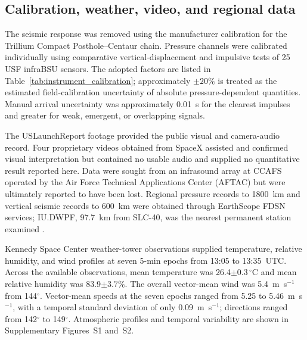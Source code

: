 \documentclass[]{seismica}
\begin{document}
\subsection{Calibration, weather, video, and regional data}

The seismic response was removed using the manufacturer calibration for the
Trillium Compact Posthole--Centaur chain. Pressure channels were calibrated
individually using comparative vertical-displacement and impulsive tests of 25
USF infraBSU sensors. The adopted factors are listed in
Table~\ref{tab:instrument_calibration}; approximately $\pm20\%$ is treated as
the estimated field-calibration uncertainty of absolute pressure-dependent
quantities. Manual arrival uncertainty was approximately 0.01~s for the
clearest impulses and greater for weak, emergent, or overlapping signals. 

The USLaunchReport footage provided the public visual and camera-audio record.
Four proprietary videos obtained from SpaceX assisted and confirmed visual
interpretation but contained no usable audio and supplied no quantitative
result reported here. Data were sought from an infrasound array at CCAFS
operated by the Air Force Technical Applications Center (AFTAC) 
but were ultimately reported to have been lost. Regional pressure records to 1800~km
and vertical seismic records to 600~km were obtained through EarthScope FDSN
services; IU.DWPF, 97.7~km from SLC-40, was the nearest permanent station
examined \citep{asl_gsn_iu_1988}. 

Kennedy Space Center weather-tower observations supplied temperature,
relative humidity, and wind profiles at seven 5-min epochs from 13:05 to
13:35~UTC. Across the available observations, mean temperature was
26.4$\pm0.3\,^{\circ}$C and mean relative humidity was
83.9$\pm3.7\%$. The overall vector-mean wind was 5.4~m~s$^{-1}$ from
144$^\circ$. Vector-mean speeds at the seven epochs ranged from 5.25 to
5.46~m~s$^{-1}$, with a temporal standard deviation of only
0.09~m~s$^{-1}$; directions ranged from 142$^\circ$ to 149$^\circ$.
Atmospheric profiles and temporal variability are shown in Supplementary
Figures~S1 and~S2.
\end{document}
